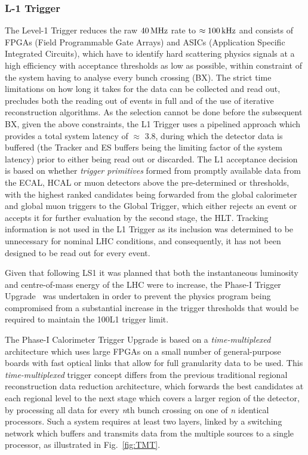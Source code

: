 \subsubsection{L-1 Trigger}\label{paragraph:L1}
The Level-1 Trigger reduces the raw $40\text{\,MHz}$ rate to $\approx100\text{\,kHz}$ and consists of FPGAs (Field Programmable Gate Arrays) and ASICs (Application Specific Integrated Circuits), which have to identify hard scattering physics signals at a high efficiency with acceptance thresholds as low as possible, within constraint of the system having to analyse every bunch crossing (BX).
The strict time limitations on how long it takes for the data can be collected and read out, precludes both the reading out of events in full and of the use of iterative reconstruction algorithms.
As the selection cannot be done before the subsequent BX, given the above constraints, the L1 Trigger uses a pipelined approach which provides a total system latency of $\approx$ 3.8\mus, during which the detector data is buffered (the Tracker and ES buffers being the limiting factor of the system latency) prior to either being read out or discarded.
The L1 acceptance decision is based on whether \emph{trigger primitives} formed from promptly available data from the ECAL, HCAL or muon detectors above the pre-determined \pT or \ET thresholds, with the highest ranked candidates being forwarded from the global calorimeter and global muon triggers to the Global Trigger, which either rejects an event or accepts it for further evaluation by the second stage, the HLT.
Tracking information is not used in the L1 Trigger as its inclusion was determined to be unnecessary for nominal LHC conditions, and consequently, it has not been designed to be read out for every event.

Given that following LS1 it was planned that both the instantaneous luminosity and centre-of-mass energy of the LHC were to increase, the Phase-I Trigger Upgrade~\cite{Tapper:2013yva} was undertaken in order to prevent the physics program being compromised from a substantial increase in the trigger thresholds that would be required to maintain the 100\kHz L1 trigger limit.	

The Phase-I Calorimeter Trigger Upgrade is based on a \emph{time-multiplexed} architecture which uses large FPGAs on a small number of general-purpose boards with fast optical links that allow for full granularity data to be used.
This \emph{time-multiplexed} trigger concept differs from the previous traditional regional reconstruction data reduction architecture, which forwards the best candidates at each regional level to the next stage which covers a larger region of the detector, by processing all data for every \emph{n}th bunch crossing on one of \emph{n} identical processors.
Such a system requires at least two layers, linked by a switching network which buffers and transmits data from the multiple sources to a single processor, as illustrated in Fig.~\ref{fig:TMT}.

